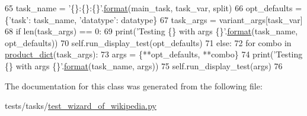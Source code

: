 \begin{DoxyCode}
65                     task\_name = \textcolor{stringliteral}{'\{\}:\{\}:\{\}'}.\hyperlink{namespaceparlai_1_1chat__service_1_1services_1_1messenger_1_1shared__utils_a32e2e2022b824fbaf80c747160b52a76}{format}(main\_task, task\_var, split)
66                     opt\_defaults = \{\textcolor{stringliteral}{'task'}: task\_name, \textcolor{stringliteral}{'datatype'}: datatype\}
67                     task\_args = variant\_args[task\_var]
68                     \textcolor{keywordflow}{if} len(task\_args) == 0:
69                         print(\textcolor{stringliteral}{'Testing \{\} with args \{\}'}.\hyperlink{namespaceparlai_1_1chat__service_1_1services_1_1messenger_1_1shared__utils_a32e2e2022b824fbaf80c747160b52a76}{format}(task\_name, opt\_defaults))
70                         self.run\_display\_test(opt\_defaults)
71                     \textcolor{keywordflow}{else}:
72                         \textcolor{keywordflow}{for} combo \textcolor{keywordflow}{in} \hyperlink{namespacetest__wizard__of__wikipedia_a164c55752f617c13303f14f70ac90b0c}{product\_dict}(task\_args):
73                             args = \{**opt\_defaults, **combo\}
74                             print(\textcolor{stringliteral}{'Testing \{\} with args \{\}'}.\hyperlink{namespaceparlai_1_1chat__service_1_1services_1_1messenger_1_1shared__utils_a32e2e2022b824fbaf80c747160b52a76}{format}(task\_name, args))
75                             self.run\_display\_test(args)
76 
\end{DoxyCode}


The documentation for this class was generated from the following file\+:\begin{DoxyCompactItemize}
\item 
tests/tasks/\hyperlink{test__wizard__of__wikipedia_8py}{test\+\_\+wizard\+\_\+of\+\_\+wikipedia.\+py}\end{DoxyCompactItemize}
